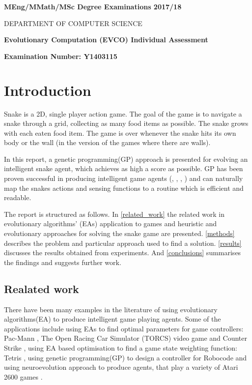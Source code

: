 \documentclass[12pt,a4paper]{article}
\begin{document}
	
	\begin{titlepage}
		\begin{center}
		\textbf{MEng/MMath/MSc Degree Examinations 2017/18}
		
		\textsc{DEPARTMENT OF COMPUTER SCIENCE}
		
		\vspace{3cm}
		
		\Large
		\textbf{Evolutionary Computation (EVCO)
		Individual Assessment}
	
		\vspace{1.5cm}
		
		\large
		\textbf{Examination Number: Y1403115}
		\end{center}
	\end{titlepage}
	
	
	\section{Introduction}
	Snake is a 2D, single player action game. The goal of the game is to navigate a snake through a grid, collecting as many food items as possible. The snake grows with each eaten food item. The game is over whenever the snake hits its own body or the wall (in the version of the games where there are walls). 
	
	In this report, a genetic programming(GP) approach is presented for evolving an intelligent snake agent, which achieves as high a score as possible. GP has been proven successful in producing intelligent game agents (\cite{ehlis_application_2000}, \cite{cole_using_2004}, \cite{shichel_gp-robocode:_2005}, \cite{koza_genetic_1992}) and can naturally map the snakes actions and sensing functions to a routine which is efficient and readable.
	
	The report is structured as follows. In \autoref{related_work} the related work in evolutionary algorithms' (EAs) application to games and heuristic and evolutionary approaches for solving the snake game are presented. \autoref{methods} describes the problem and particular approach used to find a solution. \autoref{results} discusses the results obtained from experiments. And \autoref{conclusions} summarises the findings and suggests further work.
	
	\subsection{Realated work} \label{related_work}
	There have been many examples in the literature of using evolutionary algorithms(EA) to produce intelligent game playing agents. Some of the applications include using EAs to find optimal parameters for game controllers: Pac-Mann \cite{gallagher_learning_2003}, The
	Open Racing Car Simulator (TORCS) video game \cite{munoz_multi-objective_2010} and Counter Strike \cite{cole_using_2004}, using EA based optimisation to find a game state weighting function: Tetris \cite{bohm_evolutionary_2018}, using genetic programming(GP) to design a controller for Robocode \cite{shichel_gp-robocode:_2005} and using neuroevolution approach to produce agents, that play a variety of Atari 2600 games  \cite{hausknecht_neuroevolution_2014}.
	
\end{document}
